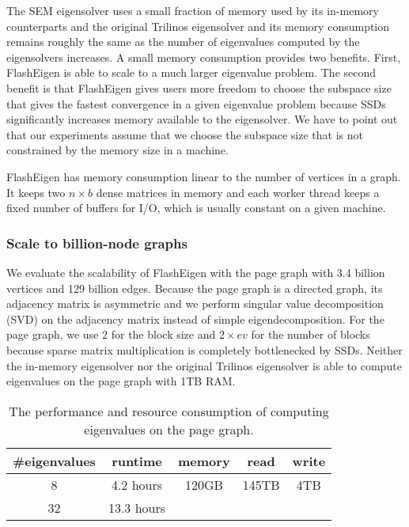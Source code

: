 The SEM eigensolver uses a small fraction of memory used by its in-memory
counterparts and the original Trilinos eigensolver and its memory consumption
remains roughly the same as the number of eigenvalues computed by the eigensolvers
increases. A small memory consumption provides two benefits. First, FlashEigen
is able to scale to a much larger eigenvalue problem. The second benefit is that
FlashEigen gives users more freedom to choose the subspace size that gives the
fastest convergence in a given eigenvalue problem because SSDs significantly
increases memory available to the eigensolver. We have to point out that our
experiments assume that we choose the subspace size that is not constrained by
the memory size in a machine.

FlashEigen has memory consumption linear to the number of vertices in a graph.
It keeps two $n \times b$ dense matrices in memory and each worker thread
keeps a fixed number of buffers for I/O, which is usually constant on a given
machine.


\begin{figure}
	\begin{center}
		\footnotesize
		
		\caption{}
		\label{perf:cache}
	\end{center}
\end{figure}


\subsubsection{Scale to billion-node graphs}

We evaluate the scalability of FlashEigen with the page graph with 3.4 billion
vertices and 129 billion edges. Because the page graph is a directed graph,
its adjacency matrix is asymmetric and we perform singular value decomposition
(SVD) on the adjacency matrix instead of simple eigendecomposition. For the page
graph, we use $2$ for the block size and $2 \times ev$ for the number of blocks
because sparse matrix multiplication is completely bottlenecked by SSDs.
Neither the in-memory eigensolver nor the original Trilinos eigensolver is able
to compute eigenvalues on the page graph with 1TB RAM.

\begin{table}
	\begin{center}
		\small
		\begin{tabular}{|c|c|c|c|c|}
			\hline
			\#eigenvalues & runtime & memory & read & write \\
			\hline
			8 & 4.2 hours & 120GB & 145TB & 4TB \\
			\hline
			32 & 13.3 hours &  &  & \\
			\hline
		\end{tabular}
		\normalsize
	\end{center}
	\caption{The performance and resource consumption of computing eigenvalues
	on the page graph.}
	\label{pg_ev}
\end{table}


